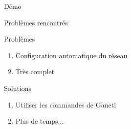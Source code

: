 
\begin{frame}
  \begin{center}
   \huge{Démo}
  \end{center}
\end{frame}

\begin{frame}{Problèmes rencontrés}
 \begin{alertblock}{Problèmes}
   \begin{enumerate}
     \item Configuration automatique du réseau
       \pause
     \item Très complet
       \pause
   \end{enumerate}
 \end{alertblock}
\pause
 \begin{exampleblock}{Solutions}
   \begin{enumerate}
     \item Utiliser les commandes de Ganeti
       \pause
     \item Plus de temps...
   \end{enumerate}
 \end{exampleblock}
\end{frame}



%
